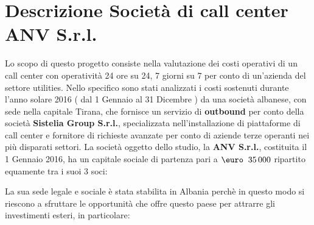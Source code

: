 \chapter{Descrizione Società di call center \ac{ANV S.r.l.}}
Lo scopo di questo progetto consiste nella valutazione dei costi operativi di un call center con operatività 24 ore su 24, 7 giorni su 7 per conto di un'azienda del settore utilities. \newline
Nello specifico sono stati analizzati i costi sostenuti durante l'anno solare 2016 ( dal 1 Gennaio al 31 Dicembre ) da una società albanese, con sede nella capitale Tirana, che fornisce un servizio di \textbf{outbound} per conto della società \textbf{Sistelia Group S.r.l.}, specializzata nell'installazione di piattaforme di call center e fornitore di richieste avanzate per conto di aziende terze operanti nei più disparati settori. \newline
La società oggetto dello studio, la \textbf{\ac{ANV S.r.l.}}, costituita il 1 Gennaio 2016, ha un capitale sociale di partenza pari a $\mbox{\euro \:35\thinspace 000}$ ripartito equamente tra i suoi 3 soci:

\newpage
La sua sede legale e sociale è stata stabilita in Albania perchè in questo modo si riescono a sfruttare le opportunità che offre questo paese per attrarre gli investimenti esteri, in particolare:
